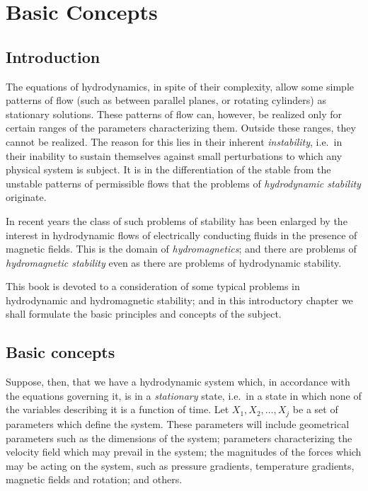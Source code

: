 
\chapter{Basic Concepts}
\label{ch:1}

\section{Introduction}
\label{sec:1-1}

The equations of hydrodynamics, in spite of their complexity, allow
some simple patterns of flow (such as between parallel planes, or rotating
cylinders) as stationary solutions.  These patterns of flow can, however,
be realized only for certain ranges of the parameters characterizing them.
Outside these ranges, they cannot be realized.  The reason for this lies
in their inherent \emph{instability}, i.e.\ in their inability to sustain themselves
against small perturbations to which any physical system is subject.  It
is in the differentiation of the stable from the unstable patterns of
permissible flows that the problems of \emph{hydrodynamic stability} originate.

In recent years the class of such problems of stability has been enlarged
by the interest in hydrodynamic flows of electrically conducting fluids
in the presence of magnetic fields.  This is the domain of \emph{hydromagnetics};
and there are problems of \emph{hydromagnetic stability} even as there are
problems of hydrodynamic stability.

This book is devoted to a consideration of some typical problems in
hydrodynamic and hydromagnetic stability; and in this introductory
chapter we shall formulate the basic principles and concepts of the
subject.

\section{Basic concepts}
\label{sec:1-2}

Suppose, then, that we have a hydrodynamic system which, in
accordance with the equations governing it, is in a \emph{stationary} state, i.e.\
in a state in which none of the variables describing it is a function of
time.  Let $X_1, X_2, \ldots, X_j$ be a set of parameters which define the system.
These parameters will include geometrical parameters such as the
dimensions of the system; parameters characterizing the velocity field
which may prevail in the system; the magnitudes of the forces which
may be acting on the system, such as pressure gradients, temperature
gradients, magnetic fields and rotation; and others.

